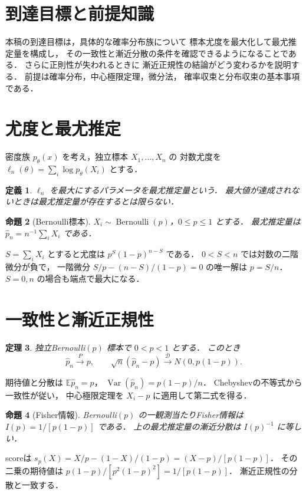 \documentclass[a5paper,10pt,onecolumn]{jsarticle}
\makeatletter
\theoremstyle{mathnotetheorem}
\newtheorem{theorem}{定理}[section]
\newtheorem{definition}[theorem]{定義}
\newtheorem{proposition}[theorem]{命題}
\renewcommand{\proofname}{証明}
\renewenvironment{proof}[1][\proofname]{%
  \par\pushQED{\qed}\normalfont\topsep4\p@\@plus2\p@\relax
  \trivlist\item[\hskip\labelsep\bfseries #1]\ignorespaces
}{\popQED\endtrivlist\@endpefalse}
\makeatother
\begin{document}
\section*{到達目標と前提知識}
本稿の到達目標は，具体的な確率分布族について
標本尤度を最大化して最尤推定量を構成し，
その一致性と漸近分散の条件を確認できるようになることである．
さらに正則性が失われるときに
漸近正規性の結論がどう変わるかを説明する．
前提は確率分布，中心極限定理，微分法，
確率収束と分布収束の基本事項である．

\section{尤度と最尤推定}
密度族 $p_\theta(x)$ を考え，独立標本 $X_1,\ldots,X_n$ の
対数尤度を $\ell_n(\theta)=\sum_i\log p_\theta(X_i)$ とする．
\begin{definition}
$\ell_n$ を最大にするパラメータを最尤推定量という．
最大値が達成されないときは最尤推定量が存在するとは限らない．
\end{definition}
\begin{proposition}[Bernoulli標本]
$X_i\sim\operatorname{Bernoulli}(p)$，$0\le p\le1$ とする．
最尤推定量は $\widehat p_n=n^{-1}\sum_i X_i$ である．
\end{proposition}
\begin{proof}
$S=\sum_iX_i$ とすると尤度は $p^S(1-p)^{n-S}$ である．
$0<S<n$ では対数の二階微分が負で，
一階微分 $S/p-(n-S)/(1-p)=0$ の唯一解は $p=S/n$．
$S=0,n$ の場合も端点で最大になる．
\end{proof}
\section{一致性と漸近正規性}
\begin{theorem}
独立Bernoulli$(p)$ 標本で $0<p<1$ とする．
このとき
\[
 \widehat p_n\xrightarrow{P}p,\qquad
 \sqrt n(\widehat p_n-p)\xrightarrow{\mathcal D}N(0,p(1-p)).
\]
\end{theorem}
\begin{proof}
期待値と分散は $\mathbb E\widehat p_n=p$，
$\operatorname{Var}(\widehat p_n)=p(1-p)/n$．
Chebyshevの不等式から一致性が従い，
中心極限定理を $X_i-p$ に適用して第二式を得る．
\end{proof}
\begin{proposition}[Fisher情報]
Bernoulli$(p)$ の一観測当たりFisher情報は
$I(p)=1/[p(1-p)]$ である．
上の最尤推定量の漸近分散は $I(p)^{-1}$ に等しい．
\end{proposition}
\begin{proof}
scoreは $s_p(X)=X/p-(1-X)/(1-p)=(X-p)/[p(1-p)]$．
その二乗の期待値は $p(1-p)/[p^2(1-p)^2]=1/[p(1-p)]$．
漸近正規性の分散と一致する．
\end{proof}
\end{document}
